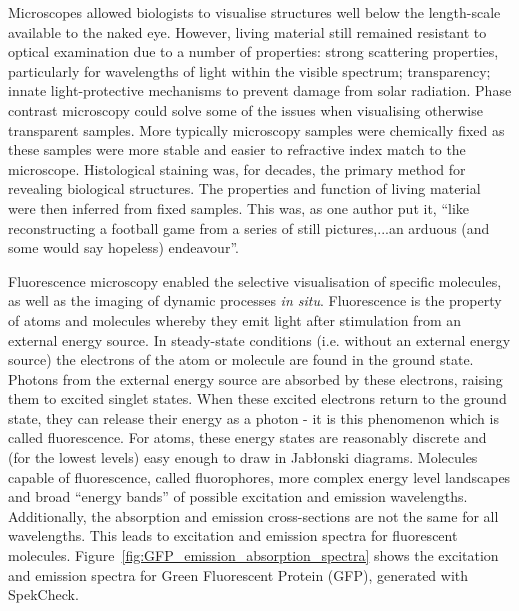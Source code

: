 Microscopes allowed biologists to visualise structures well below the 
length-scale available to the naked eye. However, living material still 
remained resistant to optical examination due to a number of properties: 
strong scattering properties, particularly for wavelengths of light 
within the visible spectrum; transparency; innate light-protective 
mechanisms to prevent damage from solar radiation. Phase contrast 
microscopy could solve some of the issues when visualising otherwise 
transparent samples\cite{burch1942phase}. More typically microscopy 
samples were chemically fixed as these samples were more stable and 
easier to refractive index match to the microscope. Histological staining 
was, for decades, the primary method for revealing biological structures\cite{alturkistani2016histological}. The properties and function 
of living material were then inferred from fixed samples. This was, as one 
author put it, ``like reconstructing a football game from a series of still 
pictures,...an arduous (and some would say hopeless) 
endeavour''\cite{yuste2005fluorescence}. 

Fluorescence microscopy enabled the selective visualisation of specific 
molecules, as well as the imaging of dynamic processes \textit{in situ}. 
Fluorescence is the property of atoms and molecules whereby they emit light
after stimulation from an external energy source. In steady-state conditions 
(i.e. without an external energy source) the electrons of the atom or  
molecule are found in the ground state. Photons from the external energy  
source are absorbed by these electrons, raising them to excited singlet 
states. When these excited electrons return to the ground state, they can 
release their energy as a photon - it is this phenomenon which is called 
fluorescence\cite{ghiran2011introduction}. For atoms, these energy states are
reasonably discrete and (for the lowest levels) easy enough to draw in 
Jab\l{}onski diagrams. Molecules capable of fluorescence, called 
fluorophores, more complex energy level landscapes and broad ``energy bands'' of possible excitation and emission 
wavelengths. Additionally, the absorption and emission cross-sections are not 
the same for all wavelengths. This leads to excitation and emission spectra 
for fluorescent molecules. Figure~\ref{fig:GFP_emission_absorption_spectra} 
shows the excitation and emission spectra for Green Fluorescent Protein 
(GFP), generated with SpekCheck\cite{phillips2018spekcheck}.

